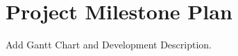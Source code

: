 
\chapter{Project Milestone Plan} %

\label{AppendixC} %

Add Gantt Chart and Development Description.